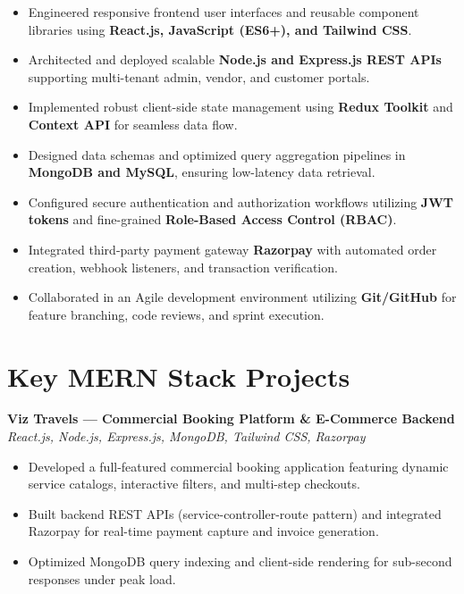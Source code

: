 \documentclass[a4paper,10pt]{article}
\begin{document}
\begin{itemize}

    \item Engineered responsive frontend user interfaces and reusable component libraries using \textbf{React.js, JavaScript (ES6+), and Tailwind CSS}.

    \item Architected and deployed scalable \textbf{Node.js and Express.js REST APIs} supporting multi-tenant admin, vendor, and customer portals.

    \item Implemented robust client-side state management using \textbf{Redux Toolkit} and \textbf{Context API} for seamless data flow.

    \item Designed data schemas and optimized query aggregation pipelines in \textbf{MongoDB and MySQL}, ensuring low-latency data retrieval.

    \item Configured secure authentication and authorization workflows utilizing \textbf{JWT tokens} and fine-grained \textbf{Role-Based Access Control (RBAC)}.

    \item Integrated third-party payment gateway \textbf{Razorpay} with automated order creation, webhook listeners, and transaction verification.

    \item Collaborated in an Agile development environment utilizing \textbf{Git/GitHub} for feature branching, code reviews, and sprint execution.

\end{itemize}

\section*{Key MERN Stack Projects}

\textbf{Viz Travels --- Commercial Booking Platform \& E-Commerce Backend}
\hfill
\textit{React.js, Node.js, Express.js, MongoDB, Tailwind CSS, Razorpay}

\begin{itemize}

    \item Developed a full-featured commercial booking application featuring dynamic service catalogs, interactive filters, and multi-step checkouts.

    \item Built backend REST APIs (service-controller-route pattern) and integrated Razorpay for real-time payment capture and invoice generation.

    \item Optimized MongoDB query indexing and client-side rendering for sub-second responses under peak load.

\end{itemize}
\end{document}
